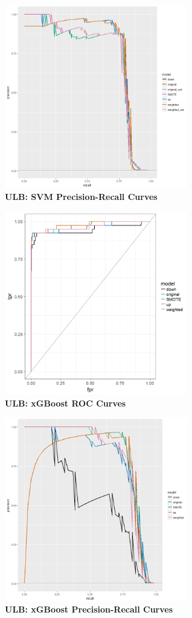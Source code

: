 \documentclass[12pt,]{article}
\begin{document}
\includegraphics[width=0.6\textwidth,height=\textheight]{figures/credit/cr_card_svm_PR.png}\\
\textbf{ULB: SVM Precision-Recall Curves}

\includegraphics[width=0.6\textwidth,height=\textheight]{figures/credit/cr_card_xgboost_rocs.png}\\
\textbf{ULB: xGBoost ROC Curves}

\includegraphics[width=0.6\textwidth,height=\textheight]{figures/credit/cr_card_xgboost_PR.png}\\
\textbf{ULB: xGBoost Precision-Recall Curves}
\end{document}
